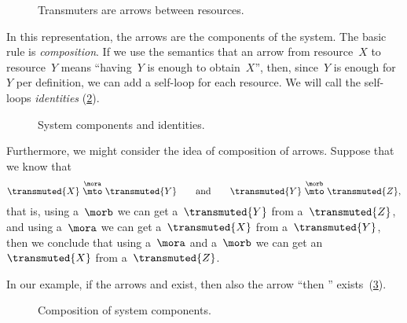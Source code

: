 
\begin{figure}[h!]
	\centering
	\caption{Transmuters are arrows between resources.}
	\label{fig:e2}
\end{figure}

In this representation, the arrows are the components of the system.
The basic rule is \emph{composition}.
If we use the semantics that an arrow from resource~$X$ to resource~$Y$ means ``having~$Y$ is enough to obtain~$X$'', then, since~$Y$ is enough for~$Y$ per definition, we can add a self-loop for each resource.
We will call the self-loops \emph{identities} (\cref{fig:e3}).

\begin{figure}[h!]
	\centering
	\caption{System components and identities. }
	\label{fig:e3}
\end{figure}


Furthermore, we might consider the idea of composition of arrows.
Suppose that we know that
\begin{equation*}
	\transmuted{X} \stackrel{\mora}{\mto} \transmuted{Y}
	\qquad \text{and} \qquad
	\transmuted{Y} \stackrel{\morb}{\mto} \transmuted{Z},
\end{equation*}
that is, using a~$\morb$ we can get a~$\transmuted{Y}$ from a~$\transmuted{Z}$, and using a~$\mora$ we can get a~$\transmuted{X}$ from a~$\transmuted{Y}$,
then we conclude that using a~$\mora$ and a~$\morb$ we can get an~$\transmuted{X}$ from a~$\transmuted{Z}$.

In our example, if the arrows \wheels  and \motor exist, then also the arrow ``\wheels then \motor'' exists~(\cref{fig:e4}).

\begin{figure}[h!]
	\centering
	\caption{Composition of system components. }
	\label{fig:e4}
\end{figure}

